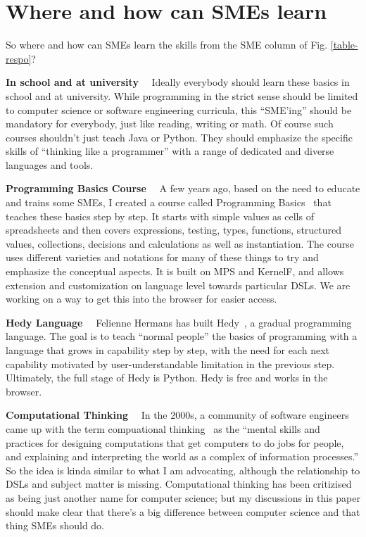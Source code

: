 \documentclass[runningheads]{llncs}
\newcommand\parhead[1]{\vspace{1mm}\noindent\textbf{{#1}}\ \ }
\newcommand{\fig}[1]{Fig. \ref{#1}}  %
\begin{document}
\section{Where and how can SMEs learn}

So where and how can SMEs learn the skills from the SME column of \fig{table-respo}? 

\parhead{In school and at university} Ideally everybody should learn these
basics in school and at university. While programming in the strict sense should
be limited to computer science or software engineering curricula, this
``SME'ing'' should be mandatory for everybody, just like reading, writing or
math. Of course such courses shouldn't just teach Java or Python. They should
emphasize the specific skills of ``thinking like a programmer'' with a range of
dedicated and diverse languages and tools.

\parhead{Programming Basics Course} A few years ago, based on the need to
educate and trains some SMEs, I created a course called Programming
Basics~\cite{voelterProgBas} that teaches these basics step by step. It starts
with simple values as cells of spreadsheets and then covers expressions,
testing, types, functions, structured values, collections, decisions and
calculations as well as instantiation. The course uses different varieties and
notations for many of these things to try and emphasize the conceptual aspects.
It is built on MPS and KernelF, and allows extension and customization on
language level towards particular DSLs. We are working on a way to get this into
the browser for easier access.


\parhead{Hedy Language} Felienne Hermans has built Hedy~\cite{hedy}, a gradual
programming language. The goal is to teach ``normal people'' the basics of
programming with a language that grows in capability step by step, with the need
for each next capability motivated by user-understandable limitation in the
previous step. Ultimately, the full stage of Hedy is Python. Hedy is free and
works in the browser.


\parhead{Computational Thinking} In the 2000s, a community of software engineers
came up with the term compuational thinking~\cite{denning2019computational} as
the ``mental skills and practices for designing computations that get computers
to do jobs for people, and explaining and interpreting the world as a complex of
information processes.'' So the idea is kinda similar to what I am advocating,
although the relationship to DSLs and subject matter is missing. Computational
thinking has been critizised as being just another name for computer science; but
my discussions in this paper should make clear that there's a big difference
between computer science and that thing SMEs should do.
\end{document}
